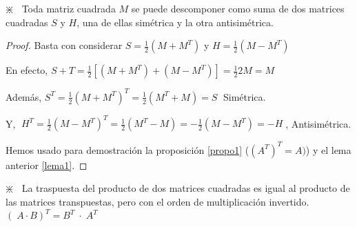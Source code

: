 \begin{teor}
$\divideontimes \; \; $ Toda matriz cuadrada $M$ se puede descomponer como suma de dos matrices cuadradas $S$ y $H$, una de ellas simétrica y la otra antisimétrica.	
\end{teor}
\begin{proof}
Basta con considerar $S=\frac 1 2 (M+M^T)$ y $H=\frac 1 2 (M-M^T)$

En efecto, $S+T = \frac 1 2 [ (M+M^T)+(M-M^T)]= \frac 1 2 2M= M$

Además, $S^T = \frac 1 2 (M+M^T)^T=\frac 1 2 (M^T+M)=S\; $ Simétrica.

Y, $\; H^T=\frac 1 2 (M-M^T)^T=\frac 1 2 (M^T-M)=-\frac 1 2 (M-M^T)=-H\;$, Antisimétrica.

Hemos usado para demostración la proposición \ref{propo1} ($(A^T)^T=A)$) y el lema anterior \ref{lema1}.
\end{proof}
\begin{teor}
$\divideontimes \; \; $ La traspuesta del producto de dos matrices cuadradas es igual al producto de las matrices transpuestas, pero con el orden de multiplicación invertido. $(\; A\cdot B)^T=B^T \; \cdot \; A^T$ 	
\end{teor}
